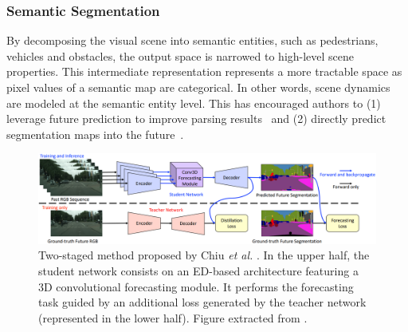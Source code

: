 \subsubsection{Semantic Segmentation}
By decomposing the visual scene into semantic entities, such as pedestrians, vehicles and obstacles, the output space is narrowed to high-level scene properties. This intermediate representation represents a more tractable space as pixel values of a semantic map are categorical. In other words, scene dynamics are modeled at the semantic entity level. This has encouraged authors to (1) leverage future prediction to improve parsing results~\cite{Jin2017} and (2) directly predict segmentation maps into the future~\cite{Luc2017, Luc2018, Luc2019}.
\begin{figure}[tbp]
	\centering
	\includegraphics[width=\textwidth]{figures/videoprediction/methods/student_teacher.png}
	\caption{Two-staged method proposed by Chiu \textit{et al.} \cite{Chiu2019}. In the upper half, the student network consists on an \ac{ED}-based architecture featuring a 3D convolutional forecasting module. It performs the forecasting task guided by an additional loss generated by the teacher network (represented in the lower half). Figure extracted from \cite{Chiu2019}.}
	\label{fig:student_teacher}
\end{figure}

